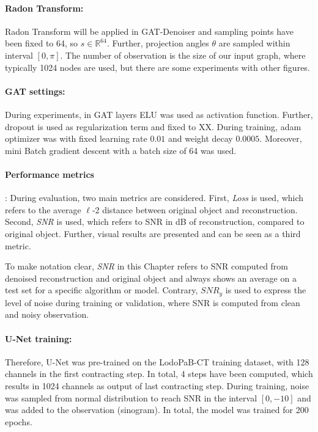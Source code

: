 \paragraph{Radon Transform:}
Radon Transform will be applied in GAT-Denoiser and sampling points have been fixed to 64, so $s \in \mathbb{R}^64$.
Further, projection angles $\theta$ are sampled within interval $[0, \pi]$.
The number of observation is the size of our input graph, where typically 1024 nodes are used, but 
there are some experiments with other figures.


\paragraph{GAT settings:}
During experiments, in GAT layers ELU was used as activation function.
Further, dropout is used as regularization term and fixed to XX.
During training, adam optimizer was with fixed learning rate $0.01$ and weight decay $0.0005$.
Moreover, mini Batch gradient descent with a batch size of 64 was used.

\paragraph{Performance metrics}:
During evaluation, two main metrics are considered.
First, \textit{Loss} is used, which refers to the average $\ell$-2 distance between original object and reconstruction.
Second, \textit{SNR} is used, which refers to SNR in dB of reconstruction, compared to original object.
Further, visual results are presented and can be seen as a third metric.

To make notation clear, \textit{SNR} in this Chapter refers to SNR computed from denoised reconstruction and original object 
and always shows an average on a test set for a specific algorithm or model.
Contrary, $\textit{SNR}_y$ is used to express the level of noise during training or validation, 
where SNR is computed from clean and noisy observation.

\paragraph{U-Net training:}
Therefore, U-Net was pre-trained on the LodoPaB-CT training dataset, with 128 channels in the first contracting step. 
In total, 4 steps have been computed, which results in 1024 channels as output of last contracting step.
During training, noise was sampled from normal distribution to reach SNR in the interval $[0, -10]$ and was added to the observation (sinogram). 
In total, the model was trained for 200 epochs.

